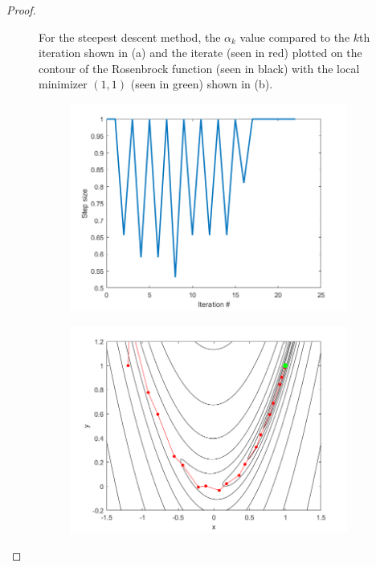 \documentclass[12pt]{report}
\begin{document}
\begin{problem}
\begin{proof}
\begin{figure}[H]
\begin{subfigure}[b]{0.5\linewidth}
            \end{subfigure}
            \caption{For the steepest descent method, the $\alpha_k$ value compared to the $k$th iteration shown in (a) and the iterate (seen in red) plotted on the contour of the Rosenbrock function (seen in black) with the local minimizer $(1,1)$ (seen in green) shown in (b).}
            \label{fig4-1}
        \end{figure}
        \begin{figure}[H]
            \begin{subfigure}[b]{0.5\linewidth}
                \centering
                \includegraphics[width=\linewidth]{images/4-2-alpha.png}
                \caption{}
                \label{fig4-2:a}
                \vspace{4ex}
            \end{subfigure}%
            \begin{subfigure}[b]{0.5\linewidth}
                \centering
                \includegraphics[width=\linewidth]{images/4-2-contour.png}

\end{subfigure}
\end{figure}
\end{proof}
\end{problem}
\end{document}
